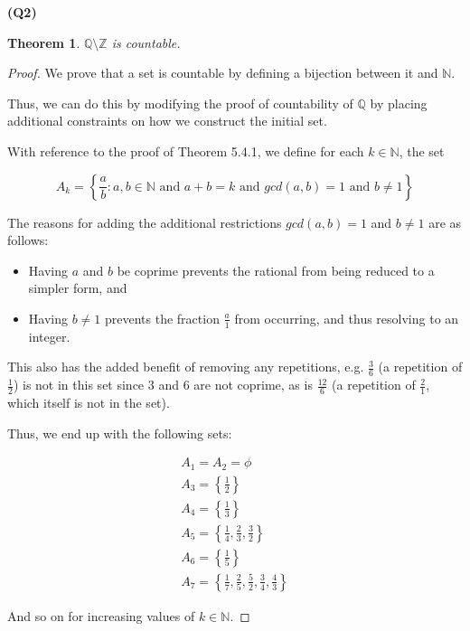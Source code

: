 \documentclass[12pt, a4paper]{article}
\newcommand{\Q}{\mathbb{Q}}
\newcommand{\Z}{\mathbb{Z}}
\newcommand{\N}{\mathbb{N}}
\newtheorem{theorem}{Theorem}
\begin{document}
\noindent\textbf{(Q2)}

\begin{theorem}
    $\Q \setminus \Z$ is countable.
\end{theorem}

\begin{proof}
    We prove that a set is countable by defining a bijection between it and $\N$.

    Thus, we can do this by modifying the proof of countability of $\Q$ by placing
    additional constraints on how we construct the initial set.

    With reference to the proof of Theorem 5.4.1, we define for each $k \in \N$, the set

    \[
        A_k = \left\{ \frac{a}{b} \colon a, b \in \N \text{ and } 
        a + b = k \text{ and $gcd(a, b) = 1$ and } b \neq 1
        \right\}
    \]

    The reasons for adding the additional restrictions $gcd(a, b) = 1$ and $b \neq 1$
    are as follows:
    \begin{itemize}
        \item Having $a$ and $b$ be coprime prevents the rational from being reduced
        to a simpler form, and
        \item Having $b \neq 1$ prevents the fraction $\frac{a}{1}$
        from occurring, and thus resolving to an integer.
    \end{itemize}

    This also has the added benefit of removing any repetitions, e.g. $\frac{3}{6}$
    (a repetition of $\frac{1}{2}$) is not in this set since 3 and 6 are not coprime,
    as is $\frac{12}{6}$ (a repetition of $\frac{2}{1}$, which itself is not in the set).

    Thus, we end up with the following sets:

    \begin{gather*}
        A_1 = A_2 = \phi\\
        A_3 = \left\{\frac{1}{2}\right\}\\
        A_4 = \left\{\frac{1}{3}\right\}\\
        A_5 = \left\{\frac{1}{4}, \frac{2}{3}, \frac{3}{2}\right\}\\
        A_6 = \left\{\frac{1}{5}\right\}\\
        A_7 = \left\{\frac{1}{7}, \frac{2}{5}, \frac{5}{2}, \frac{3}{4}, \frac{4}{3}\right\}
    \end{gather*}

    And so on for increasing values of $k \in \N$.


\end{proof}
\end{document}
